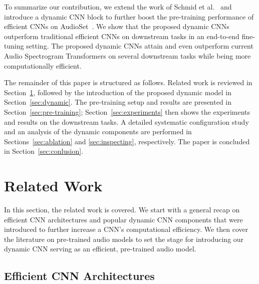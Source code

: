 \documentclass[lettersize,journal]{IEEEtran}
\begin{document}
To summarize our contribution, we extend the work of Schmid et al.~\cite{Schmid22Efficient} and introduce a dynamic CNN block to further boost the pre-training performance of efficient CNNs on AudioSet~\cite{audioset2017Gemmeke}. We show that the proposed dynamic CNNs outperform traditional efficient CNNs on downstream tasks in an end-to-end fine-tuning setting. The proposed dynamic CNNs attain and even outperform current Audio Spectrogram Transformers on several downstream tasks while being more computationally efficient.



The remainder of this paper is structured as follows. Related work is reviewed in Section~\ref{sec:related}, followed by the introduction of the proposed dynamic model in Section~\ref{sec:dynamic}. The pre-training setup and results are presented in Section~\ref{sec:pre-training}; Section~\ref{sec:experiments} then shows the experiments and results on the downstream tasks. A detailed systematic configuration study and an analysis of the dynamic components are performed in Sections~\ref{sec:ablation} and \ref{sec:inspecting}, respectively. The paper is concluded in Section~\ref{sec:conlusion}. 



\section{Related Work}
\label{sec:related}

In this section, the related work is covered. We start with a general recap on efficient CNN architectures and popular dynamic CNN components that were introduced to further increase a CNN's computational efficiency. We then cover the literature on pre-trained audio models to set the stage for introducing our dynamic CNN serving as an efficient, pre-trained audio model.

\subsection{Efficient CNN Architectures}
\end{document}
